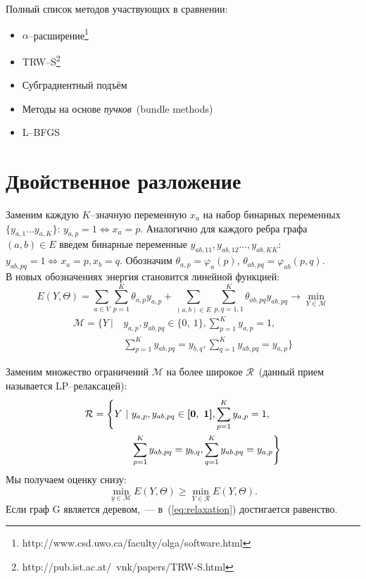 \documentclass{article}
\begin{document}
Полный список методов участвующих в сравнении:
\begin{itemize}
\item $\alpha$--расширение\footnote{http://www.csd.uwo.ca/faculty/olga/software.html}~\cite{AlphaExp}~\cite{AlphaExp2}~\cite{AlphaExp3}
\item TRW--S\footnote{http://pub.ist.ac.at/~vnk/papers/TRW-S.html}~\cite{TRWS}
\item Субградиентный подъём~\cite{Subgradient}
\item Методы на основе \textit{пучков}~(bundle methods)~\cite{Bundle}
\item L--BFGS
\end{itemize}

\section{Двойственное разложение}
Заменим каждую $K$--значную переменную $x_a$ на набор бинарных переменных $\{y_{a,1} \dots y_{a,K} \}$: $y_{a,p} = 1 \Leftrightarrow x_a = p$. Аналогично для каждого ребра графа $(a,b) \in E$ введем бинарные переменные $y_{ab,11}, y_{ab,12}\dots, y_{ab,KK}$: $y_{ab,pq} = 1 \Leftrightarrow x_a = p, x_b = q$. Обозначим $\theta_{a,p} = \varphi_{a} (p)$, $\theta_{ab,pq} = \varphi_{ab} (p, q)$.\\
В новых обозначениях энергия становится линейной функцией:
\begin{equation}
  E(Y, \Theta) = \sum_{a \in V} \sum_{p = 1}^{K} \theta_{a,p} y_{a,p} + \sum_{(a,b) \in E} \sum_{p,q = 1,1}^{K} \theta_{ab,pq} y_{ab,pq} \rightarrow \min_{Y \in \mathcal{M}}
\label{eq:main_problem}
\end{equation}
\begin{align*}
  \mathcal{M} = \Bigg \{ Y~|~&y_{a,p}, y_{ab,pq} \in \{0,~1\}, \sum_{p = 1}^{K} y_{a,p} = 1,\\
&\sum_{p = 1}^{K} y_{ab,pq} = y_{b,q}, \sum_{q = 1}^{K} y_{ab,pq} = y_{a,p} \Bigg \}
\end{align*}

Заменим множество ограничений $\mathcal{M}$ на более широкое $\mathcal{R}$~(данный прием называется LP--релаксацей):
\begin{align*}
  \mathcal{R} = \Bigg \{ Y~|~&y_{a,p}, y_{ab,pq} \in \hm{[} \mathbf{ 0,~1} \hm{]}, \sum_{p = 1}^{K} y_{a,p} = 1,\\
&\sum_{p = 1}^{K} y_{ab,pq} = y_{b,q}, \sum_{q = 1}^{K} y_{ab,pq} = y_{a,p} \Bigg \}
\end{align*}
Мы получаем оценку снизу:
\begin{equation}
\min_{y \in \mathcal{M}} E(Y, \Theta) \geq \min_{Y \in \mathcal{R}} E(Y, \Theta).
\label{eq:relaxation}
\end{equation}
Если граф G является деревом,~--- в~(\ref{eq:relaxation}) достигается равенство.
\end{document}
